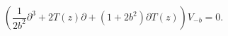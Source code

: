 \begin{equation}
\left(\frac{1}{2b^{2}}\partial^{3}+2T(z)\partial+(1+2b^{2})\partial
T(z)\right)V_{-b}=0. \nonumber
\end{equation}

